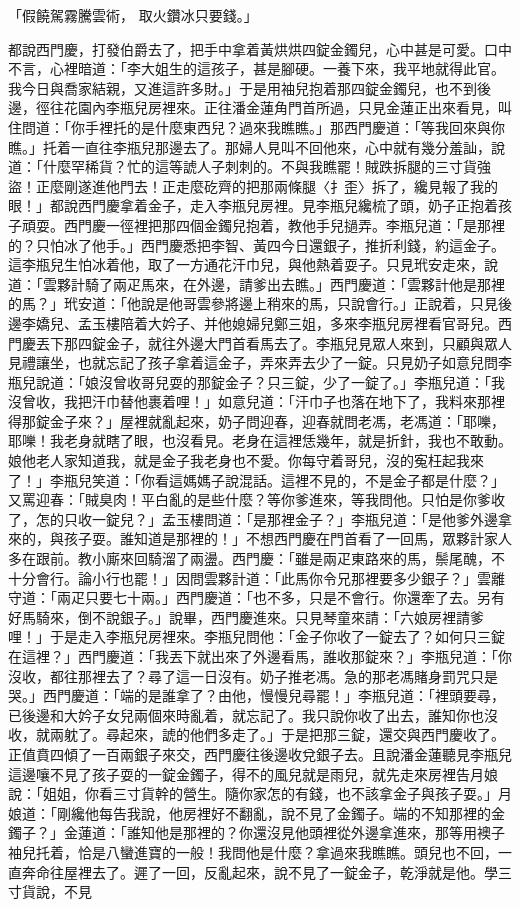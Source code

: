 \begin{showcontents}{}
「假饒駕霧騰雲術，  取火鑽冰只要錢。」

都說西門慶，打發伯爵去了，把手中拿着黃烘烘四錠金鐲兒，心中甚是可愛。口中不言，心裡暗道：「李大姐生的這孩子，甚是腳硬。一養下來，我平地就得此官。我今日與喬家結親，又進這許多財。」于是用袖兒抱着那四錠金鐲兒，也不到後邊，徑往花園內李瓶兒房裡來。正往潘金蓮角門首所過，只見金蓮正出來看見，叫住問道：「你手裡托的是什麼東西兒？過來我瞧瞧。」那西門慶道：「等我回來與你瞧。」托着一直往李瓶兒那邊去了。那婦人見叫不回他來，心中就有幾分羞訕，說道：「什麼罕稀貨？忙的這等諕人子刺刺的。不與我瞧罷！賊跌拆腿的三寸貨強盜！正麼剛遂進他門去！正走麼矻齊的把那兩條腿〈扌歪〉拆了，纔見報了我的眼！」都說西門慶拿着金子，走入李瓶兒房裡。見李瓶兒纔梳了頭，奶子正抱着孩子頑耍。西門慶一徑裡把那四個金鐲兒抱着，教他手兒撾弄。李瓶兒道：「是那裡的？只怕冰了他手。」西門慶悉把李智、黃四今日還銀子，推折利錢，約這金子。這李瓶兒生怕冰着他，取了一方通花汗巾兒，與他熱着耍子。只見玳安走來，說道：「雲夥計騎了兩疋馬來，在外邊，請爹出去瞧。」西門慶道：「雲夥計他是那裡的馬？」玳安道：「他說是他哥雲參將邊上稍來的馬，只說會行。」正說着，只見後邊李嬌兒、孟玉樓陪着大妗子、并他媳婦兒鄭三姐，多來李瓶兒房裡看官哥兒。西門慶丟下那四錠金子，就往外邊大門首看馬去了。李瓶兒見眾人來到，只顧與眾人見禮讓坐，也就忘記了孩子拿着這金子，弄來弄去少了一錠。只見奶子如意兒問李瓶兒說道：「娘沒曾收哥兒耍的那錠金子？只三錠，少了一錠了。」李瓶兒道：「我沒曾收，我把汗巾替他裹着哩！」如意兒道：「汗巾子也落在地下了，我料來那裡得那錠金子來？」屋裡就亂起來，奶子問迎春，迎春就問老馮，老馮道：「耶嚛，耶嚛！我老身就瞎了眼，也沒看見。老身在這裡恁幾年，就是折針，我也不敢動。娘他老人家知道我，就是金子我老身也不愛。你每守着哥兒，沒的寃枉起我來了！」李瓶兒笑道：「你看這媽媽子說混話。這裡不見的，不是金子都是什麼？」又罵迎春：「賊臭肉！平白亂的是些什麼？等你爹進來，等我問他。只怕是你爹收了，怎的只收一錠兒？」孟玉樓問道：「是那裡金子？」李瓶兒道：「是他爹外邊拿來的，與孩子耍。誰知道是那裡的！」不想西門慶在門首看了一回馬，眾夥計家人多在跟前。教小廝來回騎溜了兩盪。西門慶：「雖是兩疋東路來的馬，鬃尾醜，不十分會行。論小行也罷！」因問雲夥計道：「此馬你令兄那裡要多少銀子？」雲離守道：「兩疋只要七十兩。」西門慶道：「也不多，只是不會行。你還牽了去。另有好馬騎來，倒不說銀子。」說畢，西門慶進來。只見琴童來請：「六娘房裡請爹哩！」于是走入李瓶兒房裡來。李瓶兒問他：「金子你收了一錠去了？如何只三錠在這裡？」西門慶道：「我丟下就出來了外邊看馬，誰收那錠來？」李瓶兒道：「你沒收，都往那裡去了？尋了這一日沒有。奶子推老馮。急的那老馮賭身罰咒只是哭。」西門慶道：「端的是誰拿了？由他，慢慢兒尋罷！」李瓶兒道：「裡頭要尋，已後邊和大妗子女兒兩個來時亂着，就忘記了。我只說你收了出去，誰知你也沒收，就兩躭了。尋起來，諕的他們多走了。」于是把那三錠，還交與西門慶收了。正值賁四傾了一百兩銀子來交，西門慶往後邊收兌銀子去。且說潘金蓮聽見李瓶兒這邊嚷不見了孩子耍的一錠金鐲子，得不的風兒就是雨兒，就先走來房裡告月娘說：「姐姐，你看三寸貨幹的營生。隨你家怎的有錢，也不該拿金子與孩子耍。」月娘道：「剛纔他每告我說，他房裡好不翻亂，說不見了金鐲子。端的不知那裡的金鐲子？」金蓮道：「誰知他是那裡的？你還沒見他頭裡從外邊拿進來，那等用襖子袖兒托着，恰是八蠻進寶的一般！我問他是什麼？拿過來我瞧瞧。頭兒也不回，一直奔命往屋裡去了。遲了一回，反亂起來，說不見了一錠金子，乾淨就是他。學三寸貨說，不見
\end{showcontents}
